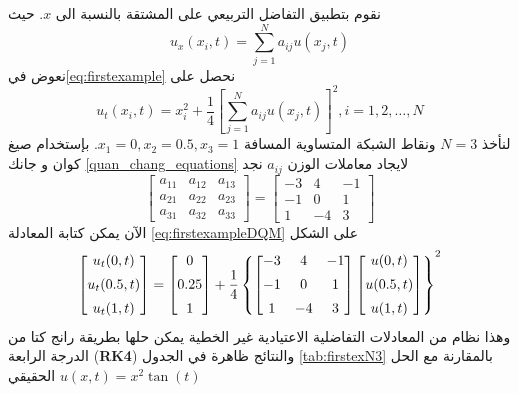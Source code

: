 \begin{solution}
	نقوم بتطبيق التفاضل التربيعي على المشتقة بالنسبة الى $x$. حيث 
	\[
	u_x(x_i, t) = \sum_{j=1}^{N} a_{ij} u(x_j, t)
	\]
	نعوض في\eqref{eq:firstexample} نحصل على
	\begin{equation}
		\label{eq:firstexampleDQM}
		u_t(x_i, t) = x_i^2 + \frac{1}{4} \left[\sum_{j=1}^{N} a_{ij} u(x_j, t)\right]^2, i=1,2,\dots,N
	\end{equation}
لنأخذ $N=3$ ونقاط الشبكة المتساوية المسافة $x_1=0, x_2=0.5, x_3=1 $. بإستخدام صيغ كوان و جانك \eqref{quan_chang_equations} لايجاد معاملات الوزن $a_{ij}$ نجد
\begin{equation*}
\begin{bmatrix}
	a_{11}&a_{12}&a_{13}\\
	a_{21}&a_{22}&a_{23}\\
	a_{31}&a_{32}&a_{33}
\end{bmatrix}=\begin{bmatrix}
	-3&4&-1\\
	-1&0&1\\
	1&-4&3
\end{bmatrix}
\end{equation*}
الآن يمكن كتابة المعادلة \eqref{eq:firstexampleDQM} على الشكل 
\begin{equation*}
	\begin{bmatrix}
		u_t(0,t)\\[5pt]
		u_t(0.5,t)\\[5pt]
		u_t(1,t)
	\end{bmatrix}=\begin{bmatrix}
		0\\[5pt]
		0.25\\[5pt]
		1
	\end{bmatrix}+\frac{1}{4}\left\{\begin{bmatrix}
			-3&4&-1\\[5pt]
			-1&0&1\\[5pt]
			1&-4&3
		\end{bmatrix}\begin{bmatrix}
			u(0,t)\\[5pt]
			u(0.5,t)\\[5pt]
			u(1,t)
	\end{bmatrix}\right\}^2
\end{equation*}
وهذا نظام من المعادلات التفاضلية الاعتيادية غير الخطية يمكن حلها بطريقة رانج كتا من الدرجة الرابعة (\textbf{RK4}) والنتائج ظاهرة في الجدول \ref{tab:firstexN3}
بالمقارنة مع الحل الحقيقي $u(x, t) = x^2 \tan(t)$


\end{solution}
